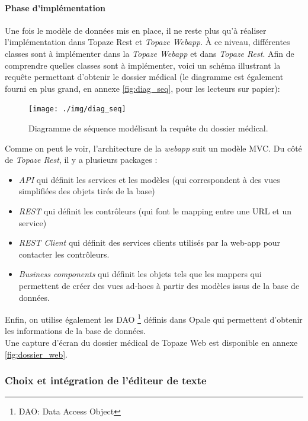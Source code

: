 \paragraph{Phase d'implémentation\\}
Une fois le modèle de données mis en place, il ne reste plus qu'à réaliser l'implémentation dans Topaze Rest et \textit{Topaze Webapp}. 
À ce niveau, différentes classes sont à implémenter dans la \textit{Topaze Webapp} et dans \textit{Topaze Rest}. Afin de comprendre quelles classes sont à implémenter, voici un schéma illustrant la requête permettant d'obtenir le dossier médical (le diagramme est également fourni en plus grand, en annexe \ref{fig:diag_seq}, pour les lecteurs sur papier):
\begin{figure}[H]
  \centering
  \texttt{[image: ./img/diag\_seq]}
  \caption{\label{fig:mb_va_ast} Diagramme de séquence modélisant la requête du dossier médical.}
\end{figure}

Comme on peut le voir, l'architecture de la \textit{webapp} suit un modèle MVC. Du côté de \textit{Topaze Rest}, il y a plusieurs packages : 
\begin{itemize} 
\item \textit{API} qui définit les services et les modèles (qui correspondent à des vues simplifiées des objets tirés de la base)
\item \textit{REST} qui définit les contrôleurs (qui font le mapping entre une URL et un service)
\item \textit{REST Client} qui définit des services clients utilisés par la web-app pour contacter les contrôleurs.
\item \textit{Business components} qui définit les objets tels que les mappers qui permettent de créer des vues ad-hocs à partir des modèles issus de la base de données.
\end{itemize}

Enfin, on utilise également les DAO \footnote{DAO: Data Access Object} définis dans Opale qui permettent d'obtenir les informations de la base de données.\\

Une capture d'écran du dossier médical de Topaze Web est disponible en annexe \ref{fig:dossier_web}.

\subsubsection{Choix et intégration de l'éditeur de texte}\label{editeur_section}

